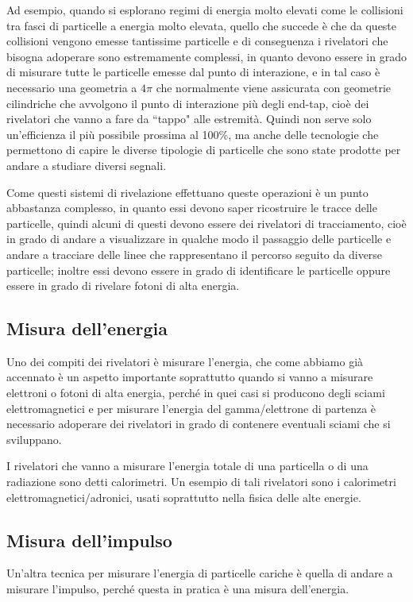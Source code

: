 Ad esempio, quando si esplorano regimi di energia molto elevati come le collisioni tra fasci di particelle a energia molto elevata, quello che succede è che da queste collisioni vengono emesse tantissime particelle e di conseguenza i rivelatori che bisogna adoperare sono estremamente complessi, in quanto devono essere in grado di misurare tutte le particelle emesse dal punto di interazione, e in tal caso è necessario una geometria a $4\pi$ che normalmente viene assicurata con geometrie cilindriche che avvolgono il punto di interazione più degli end-tap, cioè dei rivelatori che vanno a fare da ``tappo" alle estremità. Quindi non serve solo un'efficienza il più possibile prossima al 100\%, ma anche delle tecnologie che permettono di capire le diverse tipologie di particelle che sono state prodotte per andare a studiare diversi segnali. 

Come questi sistemi di rivelazione effettuano queste operazioni è un punto abbastanza complesso, in quanto essi devono saper ricostruire le tracce delle particelle, quindi alcuni di questi devono essere dei rivelatori di tracciamento, cioè in grado di andare a visualizzare in qualche modo il passaggio delle particelle e andare a tracciare delle linee che rappresentano il percorso seguito da diverse particelle; inoltre essi devono essere in grado di identificare le particelle oppure essere in grado di rivelare fotoni di alta energia.

\subsection{Misura dell'energia}

Uno dei compiti dei rivelatori è misurare l'energia, che come abbiamo già accennato è un aspetto importante soprattutto quando si vanno a misurare elettroni o fotoni di alta energia, perché in quei casi si producono degli sciami elettromagnetici e per misurare l'energia del gamma/elettrone di partenza è necessario adoperare dei rivelatori in grado di contenere eventuali sciami che si sviluppano.

I rivelatori che vanno a misurare l'energia totale di una particella o di una radiazione sono detti calorimetri. Un esempio di tali rivelatori sono i calorimetri elettromagnetici/adronici, usati soprattutto nella fisica delle alte energie.

\subsection{Misura dell'impulso}
Un'altra tecnica per misurare l'energia di particelle cariche è quella di andare a misurare l'impulso, perché questa in pratica è una misura dell'energia.

